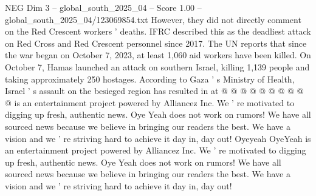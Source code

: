 \begin{textsample}{NEG Dim 3 – global\_south\_2025\_04 – Score 1.00 – global\_south\_2025\_04/123069854.txt}
However, they did not directly comment on the Red Crescent workers ' deaths.
IFRC described this as the deadliest attack on Red Cross and Red Crescent personnel since 2017.
The UN reports that since the war began on October 7, 2023, at least 1,060 aid workers have been killed.
On October 7, Hamas launched an attack on southern Israel, killing 1,139 people and taking approximately 250 hostages.
According to Gaza ' s Ministry of Health, Israel ' s assault on the besieged region has resulted in at @ @ @ @ @ @ @ @ @ @ is an entertainment project powered by Alliancez Inc.
We ' re motivated to digging up fresh, authentic news.
Oye Yeah does not work on rumors!
We have all sourced news because we believe in bringing our readers the best.
We have a vision and we ' re striving hard to achieve it day in, day out!
Oyeyeah OyeYeah is an entertainment project powered by Alliancez Inc.
We ' re motivated to digging up fresh, authentic news.
Oye Yeah does not work on rumors!
We have all sourced news because we believe in bringing our readers the best.
We have a vision and we ' re striving hard to achieve it day in, day out!

\end{textsample}
